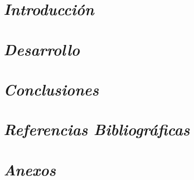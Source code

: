 \documentclass[12pt,a4paper]{article}
\begin{document}
\tableofcontents
\newpage


\section{{\color{azulnoche}\textbf{\textit{Introducción}}}}

\section{{\color{azulnoche}\textbf{\textit{Desarrollo}}}}

\section{{\color{azulnoche}\textbf{\textit{Conclusiones}}}}

\section{{\color{azulnoche}\textbf{\textit{Referencias Bibliográficas}}}}

\section{{\color{azulnoche}\textbf{\textit{Anexos}}}}
\end{document}
